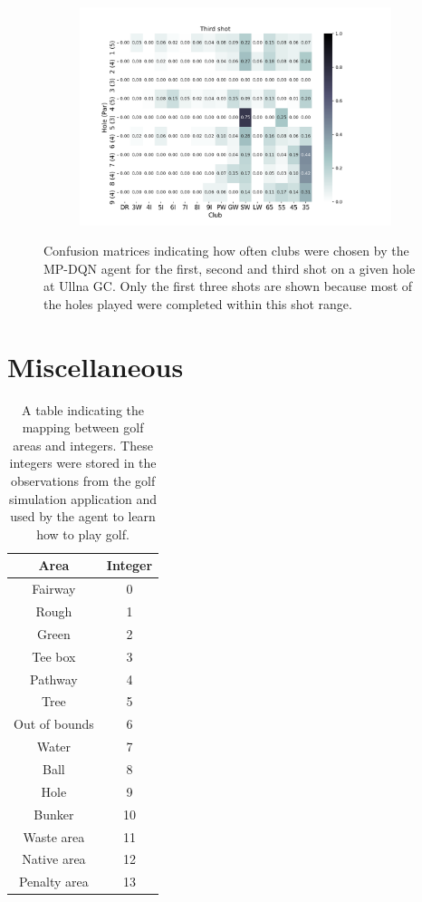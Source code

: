 \documentclass{kththesis}
\begin{document}
\begin{figure}
\begin{subfigure}{\textwidth}
    \includegraphics[height=0.3\textheight]{AgentClubChoices/MPDQN_Ullna_Club_Choices_Third_Shot.png} 
    \end{subfigure}
    \caption{Confusion matrices indicating how often clubs were chosen by the MP-DQN agent for the first, second and third shot on a given hole at Ullna GC. Only the first three shots are shown because most of the holes played were completed within this shot range.}
    \label{fig:MPDQN_ullna_club_choice_confusion}
\end{figure}

\chapter{Miscellaneous}
\begin{table}
    \centering
    \begin{tabular}{c|c}
        \textbf{Area} & \textbf{Integer} \\ \hline
        Fairway & 0 \\ 
        Rough & 1 \\ 
        Green & 2 \\ 
        Tee box & 3 \\ 
        Pathway & 4 \\ 
        Tree & 5 \\ 
        Out of bounds & 6 \\ 
        Water & 7 \\ 
        Ball & 8 \\ 
        Hole & 9 \\ 
        Bunker & 10 \\ 
        Waste area & 11 \\ 
        Native area & 12 \\ 
        Penalty area & 13 \\ 
    \end{tabular}
    \caption{A table indicating the mapping between golf areas and integers. These integers were stored in the observations from the golf simulation application and used by the agent to learn how to play golf.}
    \label{app:tab:areamapping}
\end{table}

\tailmatter
\end{document}
